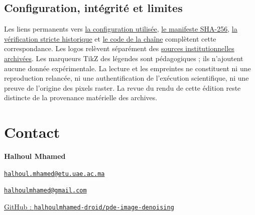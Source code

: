 \subsection*{Configuration, intégrité et limites}
Les liens permanents vers
\href{https://github.com/halhoulmhamed-droid/pde-image-denoising/blob/ae03109cdb2150b760e5a4b8bcffb56bba1b98e0/results/extended/config_used.json}{la configuration utilisée},
\href{https://github.com/halhoulmhamed-droid/pde-image-denoising/blob/ae03109cdb2150b760e5a4b8bcffb56bba1b98e0/results/extended/manifest.json}{le manifeste SHA-256},
\href{https://github.com/halhoulmhamed-droid/pde-image-denoising/blob/ae03109cdb2150b760e5a4b8bcffb56bba1b98e0/results/extended/verification.json}{la vérification stricte historique}
et \href{https://github.com/halhoulmhamed-droid/pde-image-denoising/blob/ae03109cdb2150b760e5a4b8bcffb56bba1b98e0/src/pde_image_denoising/experiments.py}{le code de la chaîne}
complètent cette correspondance. Les logos relèvent séparément des
\href{https://github.com/halhoulmhamed-droid/pde-image-denoising/blob/ae03109cdb2150b760e5a4b8bcffb56bba1b98e0/assets/logos/SOURCES.md}{sources institutionnelles archivées}.
Les marqueurs TikZ des légendes sont pédagogiques ; ils n'ajoutent aucune
donnée expérimentale. La lecture et les empreintes ne constituent ni une
reproduction relancée, ni une authentification de l'exécution scientifique,
ni une preuve de l'origine des pixels raster. La revue du rendu de cette
édition reste distincte de la provenance matérielle des archives.

\clearpage
\section{Contact}
\label{ann:contact-halhoul}
\noindent\textbf{Halhoul Mhamed}\par
\smallskip
\noindent
\href{mailto:halhoul.mhamed@etu.uae.ac.ma}{\nolinkurl{halhoul.mhamed@etu.uae.ac.ma}}\par
\noindent
\href{mailto:halhoulmhamed@gmail.com}{\nolinkurl{halhoulmhamed@gmail.com}}\par
\medskip
\noindent
\href{https://github.com/halhoulmhamed-droid/pde-image-denoising}{GitHub : \nolinkurl{halhoulmhamed-droid/pde-image-denoising}}
